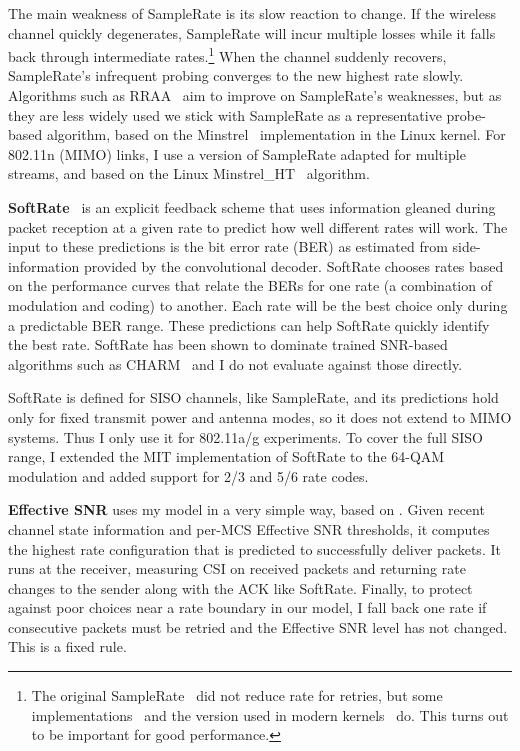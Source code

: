 The main weakness of SampleRate is its slow reaction to change. If the wireless channel quickly degenerates, SampleRate will incur multiple losses while it falls back through intermediate rates.\footnote{The original SampleRate~\cite{Bicket_SampleRate} did not reduce rate for retries, but some implementations~\cite{Judd_CHARM} and the version used in modern kernels~\cite{Minstrel} do. This turns out to be important for good performance.} When the channel suddenly recovers, SampleRate's infrequent probing converges to the new highest rate slowly. Algorithms such as 
RRAA~\cite{Wong_RRAA} aim to improve on SampleRate's weaknesses, but as they are less widely used we stick with SampleRate as a representative probe-based algorithm, based on the Minstrel~\cite{Minstrel} implementation in the Linux kernel. For 802.11n (MIMO) links, I use a version of SampleRate adapted for multiple streams, and based on the Linux Minstrel\_HT~\cite{Minstrel_HT} algorithm.

\textbf{SoftRate}~\cite{Vutukuru_SoftRate} is an explicit feedback scheme that uses information gleaned during packet reception at a given rate to predict how well different rates will work. The input to these predictions is the bit error rate (BER) as estimated from side-information provided by the convolutional decoder. SoftRate chooses rates based on the performance curves that relate the BERs for one rate (a combination of modulation and coding) to another. %
Each rate will be the best choice only during a predictable BER range. These predictions can help SoftRate quickly identify the best rate. SoftRate has been shown to dominate trained SNR-based algorithms such as CHARM~\cite{Judd_CHARM} and I do not evaluate against those directly.


SoftRate is defined for SISO channels, like SampleRate, 
and its predictions hold only for fixed transmit power and antenna modes, so it does not extend to MIMO systems.
Thus I only use it for 802.11a/g experiments. To cover the full SISO range, I extended the MIT implementation of SoftRate to the 64-QAM modulation and added support for 2/3 and 5/6 rate codes.

\textbf{Effective SNR} uses my model in a very simple way, based on . Given recent channel state information and per-MCS Effective SNR thresholds, it computes the highest rate configuration that is predicted to successfully deliver packets. It runs at the receiver, measuring CSI on received packets and returning rate changes to the sender along with the ACK like SoftRate. Finally, to protect against poor choices near a rate boundary in our model, I fall back one rate if consecutive packets must be retried and the Effective SNR level has not changed. This is a fixed rule.

